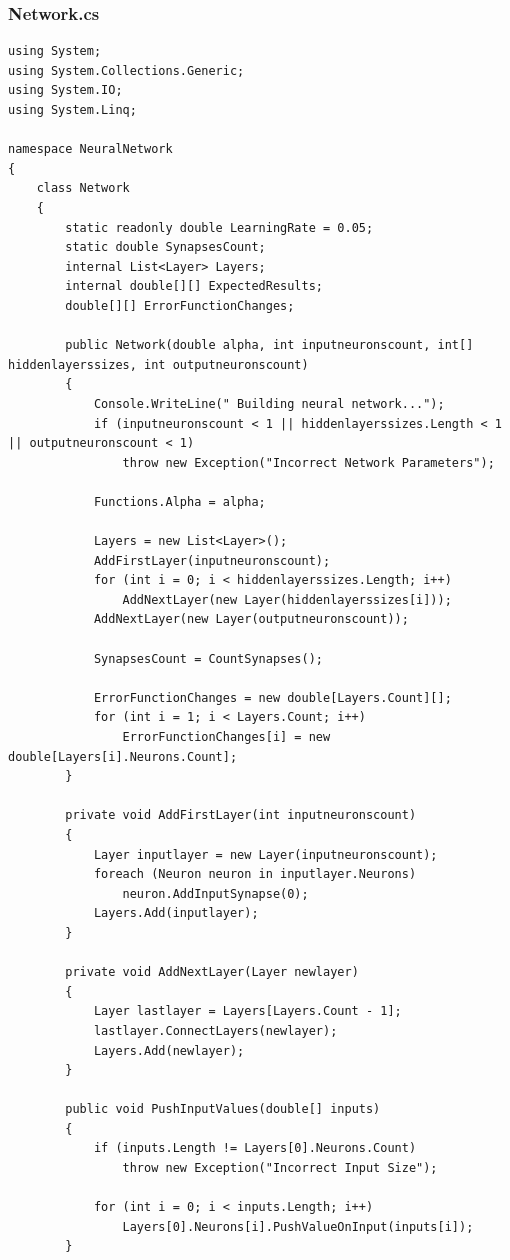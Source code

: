 \documentclass[12pt,a4paper]{article}
\begin{document}
	\subsubsection*{Network.cs}
	\begin{lstlisting}
using System;
using System.Collections.Generic;
using System.IO;
using System.Linq;

namespace NeuralNetwork
{
    class Network
    {
        static readonly double LearningRate = 0.05;
        static double SynapsesCount;
        internal List<Layer> Layers;
        internal double[][] ExpectedResults;
        double[][] ErrorFunctionChanges;

        public Network(double alpha, int inputneuronscount, int[] hiddenlayerssizes, int outputneuronscount)
        {
            Console.WriteLine(" Building neural network...");
            if (inputneuronscount < 1 || hiddenlayerssizes.Length < 1 || outputneuronscount < 1)
                throw new Exception("Incorrect Network Parameters");

            Functions.Alpha = alpha;

            Layers = new List<Layer>();
            AddFirstLayer(inputneuronscount);
            for (int i = 0; i < hiddenlayerssizes.Length; i++)
                AddNextLayer(new Layer(hiddenlayerssizes[i]));
            AddNextLayer(new Layer(outputneuronscount));

            SynapsesCount = CountSynapses();

            ErrorFunctionChanges = new double[Layers.Count][];
            for (int i = 1; i < Layers.Count; i++) 
                ErrorFunctionChanges[i] = new double[Layers[i].Neurons.Count];
        }

        private void AddFirstLayer(int inputneuronscount)
        {
            Layer inputlayer = new Layer(inputneuronscount);
            foreach (Neuron neuron in inputlayer.Neurons) 
                neuron.AddInputSynapse(0);
            Layers.Add(inputlayer);
        }

        private void AddNextLayer(Layer newlayer)
        {
            Layer lastlayer = Layers[Layers.Count - 1];
            lastlayer.ConnectLayers(newlayer);
            Layers.Add(newlayer);
        }

        public void PushInputValues(double[] inputs)
        {
            if (inputs.Length != Layers[0].Neurons.Count) 
                throw new Exception("Incorrect Input Size");

            for (int i = 0; i < inputs.Length; i++) 
                Layers[0].Neurons[i].PushValueOnInput(inputs[i]);
        }


\end{lstlisting}
\end{document}
